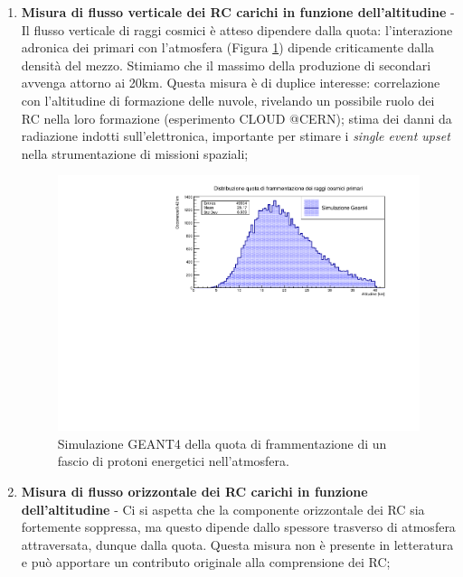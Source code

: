 \begin{enumerate}
    \item \textbf{Misura di flusso verticale dei RC carichi in funzione dell'altitudine} - Il flusso verticale di raggi cosmici è atteso dipendere dalla quota: l'interazione adronica dei primari con l'atmosfera (Figura \ref{frammentazione primari}) dipende criticamente dalla densità del mezzo. Stimiamo che il massimo della produzione di secondari avvenga attorno ai 20km. Questa misura è di duplice interesse: correlazione con l'altitudine di formazione delle nuvole, rivelando un possibile ruolo dei RC nella loro formazione (esperimento CLOUD @CERN); stima dei danni da radiazione indotti sull'elettronica, importante per stimare i \textit{single event upset} nella strumentazione di missioni spaziali;
    \begin{figure}
        \centering
        \includegraphics[width=0.9\linewidth]{Frammentazione_verticale.pdf}
        \caption{Simulazione GEANT4 della quota di frammentazione di un fascio di protoni energetici nell'atmosfera.}
        \label{frammentazione primari}
    \end{figure}
    
    \item \textbf{Misura di flusso orizzontale dei RC carichi in funzione dell'altitudine} - Ci si aspetta che la componente orizzontale dei RC sia fortemente soppressa, ma questo dipende dallo spessore trasverso di atmosfera attraversata, dunque dalla quota. Questa misura non è presente in letteratura e può apportare un contributo originale alla comprensione dei RC;
    

\end{enumerate}
